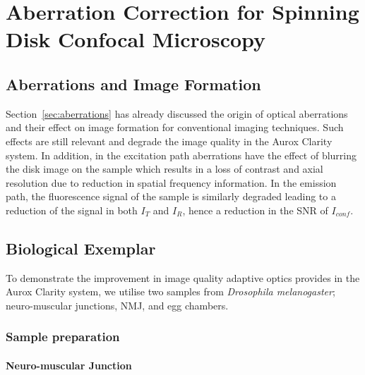\chapter{Aberration Correction for Spinning Disk Confocal Microscopy}
\label{chpt:Aurox}

\section{Aberrations and Image Formation}
\label{subsec:Aurox_aberrations}

Section~\ref{sec:aberrations} has already discussed the origin of 
optical aberrations and their effect on image formation for 
conventional imaging techniques. Such effects are still relevant
and degrade the image quality in the Aurox Clarity system. In addition,
in the excitation path aberrations have the effect of blurring the 
disk image on the sample which results in a loss of contrast and 
axial resolution due to reduction in spatial frequency
information\cite{wilson1990confocal, hell1993aberrations}. In the 
emission path, the fluorescence signal of the sample is similarly
degraded leading to a reduction of the signal in both $I_{T}$ and
$I_{R}$, hence a reduction in the SNR of $I_{conf}$. 

\section{Biological Exemplar}
\label{sec:Aurox_biology}

To demonstrate the improvement in image quality adaptive optics
provides in the Aurox Clarity system, we utilise two samples from
\textit{Drosophila melanogaster}; neuro-muscular junctions, NMJ, 
and egg chambers.

\subsection{Sample preparation}
\label{subsec:Aurox_sample_prep}

\subsubsection{Neuro-muscular Junction}
\label{subsubsec:Aurox_NMJ_prep}

